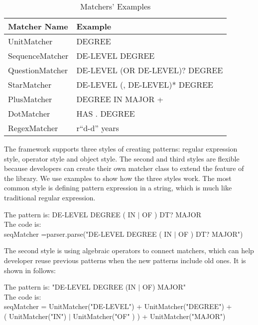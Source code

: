 \begin{table}[ht]
\caption{Matchers' Examples } %
\centering %
\begin{tabular}{  | l |  l |  }
 \hline
 Matcher Name          & Example    \\
 \hline
 UnitMatcher         & DEGREE       \\
 \hline
 SequenceMatcher     & DE-LEVEL DEGREE       \\
  \hline
 QuestionMatcher     & DE-LEVEL (OR DE-LEVEL)?  DEGREE       \\
  \hline
 StarMatcher         & DE-LEVEL (, DE-LEVEL)*  DEGREE       \\
  \hline
 PlusMatcher         & DEGREE IN MAJOR +      \\
  \hline
 DotMatcher          & HAS . DEGREE      \\
  \hline
 RegexMatcher        & r``d-d'' years  \\
  \hline

\end{tabular}
\label{tab:matchers_example} %
\end{table}

The framework supports three styles of creating patterns: regular expression style, operator style and object style. The second and third styles are flexible because developers can create their own matcher class to extend the feature of the library. We use examples to show how the three styles work. The most common style is defining pattern expression in a string, which is much like traditional regular expression.

\begin{framed}
\small
\noindent
The pattern is:  DE-LEVEL DEGREE ( IN  $\vert$  OF ) DT? MAJOR \\
The code is: \\
seqMatcher =parser.parse("DE-LEVEL DEGREE ( IN  $\vert$  OF ) DT? MAJOR")

\end{framed}

The second style is using algebraic operators to connect matchers, which can help developer reuse previous patterns when the new patterns include old ones. It is shown in follows:
\begin{framed}
\small
\noindent
The pattern is:  "DE-LEVEL DEGREE (IN $\vert$ OF) MAJOR" \\
The code is: \\
seqMatcher =  UnitMatcher("DE-LEVEL") +  UnitMatcher("DEGREE") + \\
\hspace{3cm} ( UnitMatcher("IN") $\vert$ UnitMatcher("OF" ) ) + UnitMatcher("MAJOR")

\end{framed}

